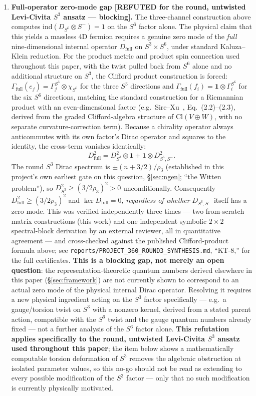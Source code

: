 \documentclass[12pt,a4paper]{article}
\newcommand{\ind}{\mathrm{ind}}
\begin{document}
\begin{enumerate}
\item \textbf{Full-operator zero-mode gap [REFUTED for the round, untwisted
  Levi-Civita $S^3$ ansatz --- blocking].} The three-channel construction above computes
  $\ind(D_{S^6}\otimes S^-)=1$ on the $S^6$ factor alone. The physical claim that
  this yields a massless 4D fermion requires a genuine zero mode of the \emph{full}
  nine-dimensional internal operator $D_{\mathrm{full}}$ on $S^3\times S^6$, under
  standard Kaluza--Klein reduction. For the product metric and product spin
  connection used throughout this paper, with the twist pulled back from $S^6$
  alone and no additional structure on $S^3$, the Clifford product construction is
  forced: $\Gamma_{\mathrm{full}}(e_j)=\Gamma^{S^3}_j\otimes\chi_{S^6}$ for the
  three $S^3$ directions and $\Gamma_{\mathrm{full}}(f_i)=\mathbf{1}\otimes
  \Gamma^{S^6}_i$ for the six $S^6$ directions, matching the standard construction
  for a Riemannian product with an even-dimensional factor (e.g.\
  Sire--Xu~\cite{SireXu2020}, Eq.~(2.2)--(2.3), derived from the graded
  Clifford-algebra structure of $\mathrm{Cl}(V\oplus W)$, with no separate
  curvature-correction term). Because a chirality operator always anticommutes
  with its own factor's Dirac operator and squares to the identity, the cross-term
  vanishes identically:
  \[
    D_{\mathrm{full}}^2 = D_{S^3}^2\otimes\mathbf{1} + \mathbf{1}\otimes
    D_{S^6,S^-}^2.
  \]
  The round $S^3$ Dirac spectrum is $\pm(n+3/2)/\rho_3$ (established in this
  project's own earliest gate on this question, \S\ref{sec:ngen}; ``the Witten
  problem''), so $D_{S^3}^2\geq (3/2\rho_3)^2>0$ unconditionally. Consequently
  $D_{\mathrm{full}}^2\geq(3/2\rho_3)^2$ and $\ker D_{\mathrm{full}}=0$,
  \emph{regardless of whether} $D_{S^6,S^-}$ itself has a zero mode. This was
  verified independently three times --- two from-scratch matrix constructions
  (this work) and one independent symbolic $2\times2$ spectral-block derivation by
  an external reviewer, all in quantitative agreement --- and cross-checked
  against the published Clifford-product formula above; see
  \texttt{reports/PROJECT\_360\_ROUND3\_SYNTHESIS.md}, ``KT-8,'' for the full
  certificates. \textbf{This is a blocking gap, not merely an open question}: the
  representation-theoretic quantum numbers derived elsewhere in this paper
  (\S\ref{sec:framework}) are not currently shown to correspond to an actual zero
  mode of the physical internal Dirac operator. Resolving it requires a new
  physical ingredient acting on the $S^3$ factor specifically --- e.g.\ a
  gauge/torsion twist on $S^3$ with a nonzero kernel, derived from a stated parent
  action, compatible with the $S^6$ twist and the gauge quantum numbers already
  fixed --- not a further analysis of the $S^6$ factor alone. \textbf{This
  refutation applies specifically to the round, untwisted Levi-Civita $S^3$
  ansatz used throughout this paper}; the item below shows a mathematically
  computable torsion deformation of $S^3$ removes the algebraic obstruction at
  isolated parameter values, so this no-go should not be read as extending to
  every possible modification of the $S^3$ factor --- only that no such
  modification is currently physically motivated.


\end{enumerate}
\end{document}
